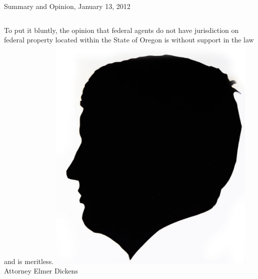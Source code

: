 \begin{frame}{Summary and Opinion, January 13, 2012}
    \begin{columns}[onlytextwidth]
To put it bluntly, the opinion that federal agents do not have jurisdiction on federal property located within the State of Oregon is without support in the law and is meritless.
            \centering
            \includegraphics[width=0.75\textwidth]{img/elmer-dickens.png}
            \\ Attorney Elmer Dickens \\
    \end{columns}
\end{frame}

\def\braces#1{[#1]}

